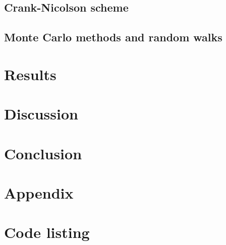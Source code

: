 \documentclass[a4paper, 11pt, notitlepage,english]{article}
\begin{document}
\subsection{Crank-Nicolson scheme}
\subsection{Monte Carlo methods and random walks}

\section{Results}

\section{Discussion}

\section{Conclusion}

\section{Appendix}



\section*{Code listing}


 
 
\end{document}
